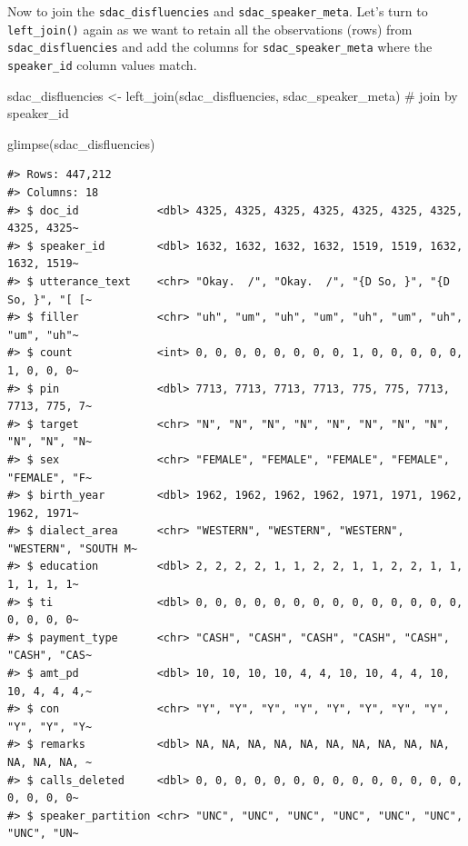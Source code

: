 \documentclass[
  letterpaper,
]{latex/krantz}
\newenvironment{Shaded}{\begin{snugshade}}{\end{snugshade}}
\newcommand{\CommentTok}[1]{\textcolor[rgb]{0.37,0.37,0.37}{#1}}
\newcommand{\FunctionTok}[1]{\textcolor[rgb]{0.28,0.35,0.67}{#1}}
\newcommand{\NormalTok}[1]{\textcolor[rgb]{0.00,0.23,0.31}{#1}}
\newcommand{\OtherTok}[1]{\textcolor[rgb]{0.00,0.23,0.31}{#1}}
\begin{document}
Now to join the \texttt{sdac\_disfluencies} and
\texttt{sdac\_speaker\_meta}. Let's turn to \texttt{left\_join()} again
as we want to retain all the observations (rows) from
\texttt{sdac\_disfluencies} and add the columns for
\texttt{sdac\_speaker\_meta} where the \texttt{speaker\_id} column
values match.

\begin{Shaded}
\begin{Highlighting}[]
\NormalTok{sdac\_disfluencies }\OtherTok{\textless{}{-}} 
  \FunctionTok{left\_join}\NormalTok{(sdac\_disfluencies, sdac\_speaker\_meta) }\CommentTok{\# join by \textasciigrave{}\textasciigrave{}speaker\_id\textasciigrave{}}

\FunctionTok{glimpse}\NormalTok{(sdac\_disfluencies)}
\end{Highlighting}
\end{Shaded}

\begin{verbatim}
#> Rows: 447,212
#> Columns: 18
#> $ doc_id            <dbl> 4325, 4325, 4325, 4325, 4325, 4325, 4325, 4325, 4325~
#> $ speaker_id        <dbl> 1632, 1632, 1632, 1632, 1519, 1519, 1632, 1632, 1519~
#> $ utterance_text    <chr> "Okay.  /", "Okay.  /", "{D So, }", "{D So, }", "[ [~
#> $ filler            <chr> "uh", "um", "uh", "um", "uh", "um", "uh", "um", "uh"~
#> $ count             <int> 0, 0, 0, 0, 0, 0, 0, 0, 1, 0, 0, 0, 0, 0, 1, 0, 0, 0~
#> $ pin               <dbl> 7713, 7713, 7713, 7713, 775, 775, 7713, 7713, 775, 7~
#> $ target            <chr> "N", "N", "N", "N", "N", "N", "N", "N", "N", "N", "N~
#> $ sex               <chr> "FEMALE", "FEMALE", "FEMALE", "FEMALE", "FEMALE", "F~
#> $ birth_year        <dbl> 1962, 1962, 1962, 1962, 1971, 1971, 1962, 1962, 1971~
#> $ dialect_area      <chr> "WESTERN", "WESTERN", "WESTERN", "WESTERN", "SOUTH M~
#> $ education         <dbl> 2, 2, 2, 2, 1, 1, 2, 2, 1, 1, 2, 2, 1, 1, 1, 1, 1, 1~
#> $ ti                <dbl> 0, 0, 0, 0, 0, 0, 0, 0, 0, 0, 0, 0, 0, 0, 0, 0, 0, 0~
#> $ payment_type      <chr> "CASH", "CASH", "CASH", "CASH", "CASH", "CASH", "CAS~
#> $ amt_pd            <dbl> 10, 10, 10, 10, 4, 4, 10, 10, 4, 4, 10, 10, 4, 4, 4,~
#> $ con               <chr> "Y", "Y", "Y", "Y", "Y", "Y", "Y", "Y", "Y", "Y", "Y~
#> $ remarks           <dbl> NA, NA, NA, NA, NA, NA, NA, NA, NA, NA, NA, NA, NA, ~
#> $ calls_deleted     <dbl> 0, 0, 0, 0, 0, 0, 0, 0, 0, 0, 0, 0, 0, 0, 0, 0, 0, 0~
#> $ speaker_partition <chr> "UNC", "UNC", "UNC", "UNC", "UNC", "UNC", "UNC", "UN~
\end{verbatim}
\end{document}
